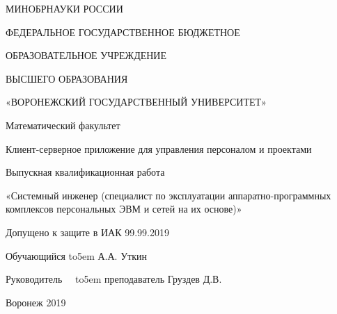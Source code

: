 \documentclass[14pt, a4paper]{extarticle}
\begin{document}
    \begin{titlepage}
        \begin{center}
            МИНОБРНАУКИ РОССИИ

            ФЕДЕРАЛЬНОЕ ГОСУДАРСТВЕННОЕ БЮДЖЕТНОЕ

            ОБРАЗОВАТЕЛЬНОЕ УЧРЕЖДЕНИЕ

            ВЫСШЕГО ОБРАЗОВАНИЯ

            «ВОРОНЕЖСКИЙ ГОСУДАРСТВЕННЫЙ УНИВЕРСИТЕТ»

            \begin{spacing}{4}
            \end{spacing}

            Математический факультет
            \begin{spacing}{5.5}
            \end{spacing}


            Клиент-серверное приложение для управления персоналом и проектами
            \begin{spacing}{4.5}
            \end{spacing}


            Выпускная квалификационная работа 

            «Системный инженер (специалист по эксплуатации аппаратно-программных комплексов персональных ЭВМ и сетей на их основе)»

        \end{center}

        \begin{spacing}{5.5}
        \end{spacing}

        Допущено к защите в ИАК	 99.99.2019

        \begin{spacing}{2}
        \end{spacing}

        \begin{spacing}{2}
        \end{spacing}
        Обучающийся \def\hrf#1{\hbox to#1{\hrulefill}}
        \hrf{5em} А.А. Уткин
        \begin{spacing}{2}
        \end{spacing}
        Руководитель\ \ \def\hrf#1{\hbox to#1{\hrulefill}}
        \hrf{5em}
                преподаватель Груздев Д.В.

        \begin{center}
            \begin{spacing}{4}
            \end{spacing}
            Воронеж 2019
        \end{center}
    \end{titlepage}
\end{document}
